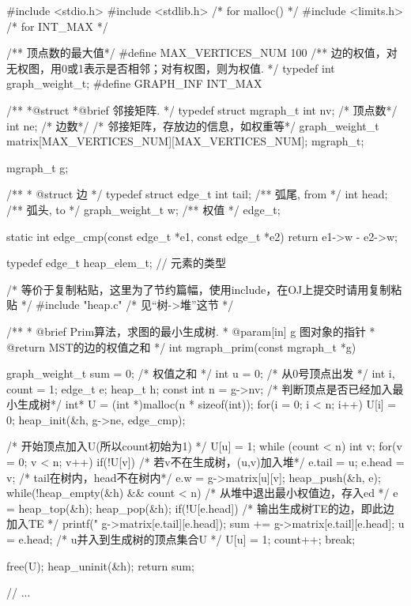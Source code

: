 \begin{Codex}[label=mgraph_prim2.c]
#include <stdio.h>
#include <stdlib.h>  /* for malloc() */
#include <limits.h>  /* for INT_MAX */

/** 顶点数的最大值*/
#define MAX_VERTICES_NUM 100
/** 边的权值，对无权图，用0或1表示是否相邻；对有权图，则为权值. */
typedef int graph_weight_t;
#define GRAPH_INF INT_MAX

/**
 *@struct
 *@brief 邻接矩阵.
 */
typedef struct mgraph_t {
    int nv; /* 顶点数*/
    int ne; /* 边数*/
    /* 邻接矩阵，存放边的信息，如权重等*/
    graph_weight_t matrix[MAX_VERTICES_NUM][MAX_VERTICES_NUM];
} mgraph_t;

mgraph_t g;


/**
 * @struct 边
 */
typedef struct edge_t{
    int tail;  /** 弧尾, from */
    int head;  /** 弧头, to */
    graph_weight_t w;  /** 权值 */
}edge_t;

static int edge_cmp(const edge_t *e1, const edge_t *e2) {
    return e1->w - e2->w;
}

typedef edge_t heap_elem_t; // 元素的类型

/* 等价于复制粘贴，这里为了节约篇幅，使用include，在OJ上提交时请用复制粘贴 */
#include "heap.c"  /* 见“树->堆”这节 */

/**
  * @brief Prim算法，求图的最小生成树.
  * @param[in] g 图对象的指针
  * @return MST的边的权值之和
  */
int mgraph_prim(const mgraph_t *g){
    graph_weight_t sum = 0; /* 权值之和 */
    int u = 0; /* 从0号顶点出发 */
    int i, count = 1;
    edge_t e;
    heap_t h;
    const int n = g->nv;
    /* 判断顶点是否已经加入最小生成树*/
    int* U = (int *)malloc(n * sizeof(int));
    for(i = 0; i < n; i++) U[i] = 0;
    heap_init(&h, g->ne, edge_cmp);

    /* 开始顶点加入U(所以count初始为1) */
    U[u] = 1;
    while (count < n) {
        int v;
        for(v = 0; v < n; v++) if(!U[v]) { /* 若v不在生成树，(u,v)加入堆*/
            e.tail = u;
            e.head = v;
            /* tail在树内，head不在树内*/
            e.w = g->matrix[u][v];
            heap_push(&h, e);
        }
        while(!heap_empty(&h) && count < n) {
            /* 从堆中退出最小权值边，存入ed */
            e = heap_top(&h); heap_pop(&h);
            if(!U[e.head]) {
                /* 输出生成树TE的边，即此边加入TE */
                printf("%
                        g->matrix[e.tail][e.head]);
                sum += g->matrix[e.tail][e.head];
                u = e.head;
                /* u并入到生成树的顶点集合U */
                U[u] = 1;
                count++;
                break;
            }
        }
    }

    free(U);
    heap_uninit(&h);
    return sum;
}

// ...
\end{Codex}

